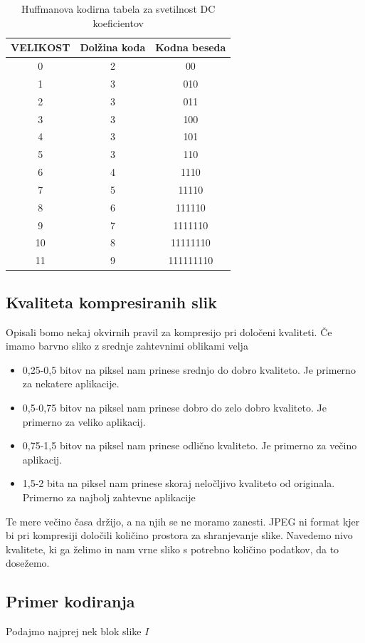 \documentclass[a4paper,12pt,openright]{book}
\begin{document}
\begin{table}[ht]
\centering
\begin{tabular}{|c|c|c|}
\hline
VELIKOST&Dolžina koda&Kodna beseda\\
\hline
0& 2& 00\\
1& 3& 010\\
2& 3& 011\\
3& 3& 100\\
4& 3& 101\\
5& 3& 110\\
6& 4& 1110\\
7& 5& 11110\\
8& 6& 111110\\
9& 7& 1111110\\
10& 8& 11111110\\
11& 9& 111111110\\
\hline
\end{tabular}
\caption{Huffmanova kodirna tabela za svetilnost DC koeficientov}
\label{tab:Huffman_DC_luminance}
\end{table}

\subsection{Kvaliteta kompresiranih slik}
Opisali bomo nekaj okvirnih pravil za kompresijo pri določeni kvaliteti. Če imamo barvno sliko z srednje zahtevnimi oblikami velja
\begin{itemize}
   \item 0,25-0,5 bitov na piksel nam prinese srednjo do dobro kvaliteto. Je primerno za nekatere aplikacije.
   \item 0,5-0,75 bitov na piksel nam prinese dobro do zelo dobro kvaliteto. Je primerno za veliko aplikacij.
   \item 0,75-1,5 bitov na piksel nam prinese odlično kvaliteto. Je primerno za večino aplikacij.
   \item 1,5-2 bita na piksel nam prinese skoraj neločljivo kvaliteto od originala. Primerno za najbolj zahtevne aplikacije
\end{itemize}
Te mere večino časa držijo, a na njih se ne moramo zanesti. JPEG ni format kjer bi pri kompresiji določili količino prostora za shranjevanje slike. Navedemo nivo kvalitete, ki ga želimo in nam vrne sliko s potrebno količino podatkov, da to dosežemo.

\subsection{Primer kodiranja}
Podajmo najprej nek blok slike $I$
\end{document}
